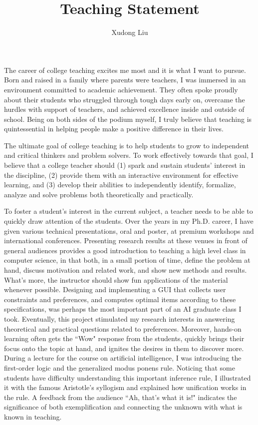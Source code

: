 \documentclass[12pt]{article}
\title{Teaching Statement\vspace{-0.4cm}}
\author{Xudong Liu}
\date{}
\begin{document}
\maketitle%

The career of college teaching excites me most and it is what I want to pursue.
Born and raised in a family where parents were teachers, I was immersed in an environment 
committed to academic achievement. They often spoke proudly about their students who
struggled through tough days early on, overcame the hurdles with support of teachers, and 
achieved excellence inside and outside of school. 
Being on both sides of the podium myself, I truly believe that
teaching is quintessential in helping people make a positive difference in their lives.

The ultimate goal of college teaching is to help students to grow to independent 
and critical thinkers and problem solvers.
To work effectively towards that goal, I believe that a college teacher should
(1) spark and sustain students' interest in the discipline,
(2) provide them with an interactive environment for effective learning, and
(3) develop their abilities to independently identify, formalize, analyze 
and solve problems both theoretically and practically.

To foster a student's interest in the current subject, 
a teacher needs to be able to quickly draw attention of the students.
Over the years in my Ph.D. career, I have given various technical
presentations, oral and poster, at premium workshops and international conferences.
Presenting research results at these venues in front of general audiences
provides a good introduction to teaching a high level class in computer science,
in that both, in a small portion of time, define the problem at hand, discuss motivation and related work,
and show new methods and results.
What's more, the instructor should show fun
applications of the material whenever possible.
Designing and implementing a GUI that collects user constraints and preferences,
and computes optimal items according to these specifications, was perhaps the most important part
of an AI graduate class I took.
Eventually, this project stimulated my research interests in answering theoretical and
practical questions related to preferences.
Moreover, hands-on learning often gets the ``Wow" response from the students, 
quickly brings their focus onto the topic at hand,
and ignites the desires in them to discover more.
During a lecture for the course on artificial intelligence,
I was introducing the first-order logic and the generalized modus ponens
rule.  Noticing that some students have difficulty understanding this
important inference rule, I illustrated it with the famous 
Aristotle's syllogism and explained how unification works in the rule.
A feedback from the audience ``Ah, that's what it is!" indicates
the significance of both exemplification and connecting the unknown with
what is known in teaching.
\end{document}
